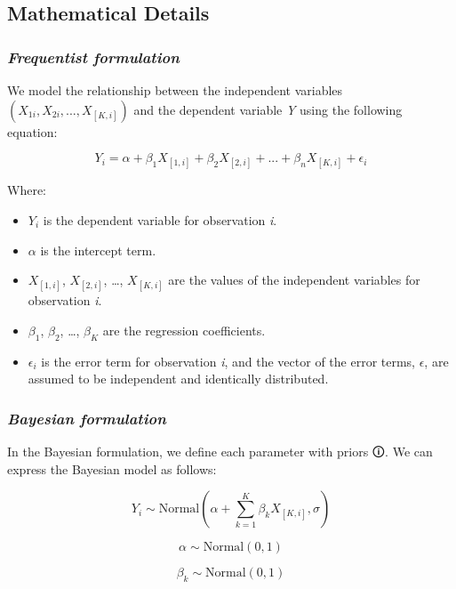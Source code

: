 \documentclass[
  letterpaper,
  DIV=11,
  numbers=noendperiod]{scrartcl}
\begin{document}
\subsection{Mathematical Details}\label{mathematical-details}

\subsubsection{\texorpdfstring{\emph{Frequentist
formulation}}{Frequentist formulation}}\label{frequentist-formulation}

We model the relationship between the independent variables
\((X_{1i}, X_{2i}, ..., X_{[K,i]})\) and the dependent variable \emph{Y}
using the following equation:

\[
𝑌_i = \alpha +\beta_1  𝑋_{[1,i]} + \beta_2  𝑋_{[2,i]} + ... + \beta_n  𝑋_{[K,i]} + \epsilon_i
\]

Where:

\begin{itemize}
\item
  \(Y_i\) is the dependent variable for observation \emph{i}.
\item
  \(\alpha\) is the intercept term.
\item
  \(X_{[1,i]}\), \(X_{[2,i]}\), \ldots, \(X_{[K,i]}\) are the values of
  the independent variables for observation \emph{i}.
\item
  \(\beta_1\), \(\beta_2\), \ldots, \(\beta_K\) are the regression
  coefficients.
\item
  \(\epsilon_i\) is the error term for observation \emph{i}, and the
  vector of the error terms, \(\epsilon\), are assumed to be independent
  and identically distributed.
\end{itemize}

\subsubsection{\texorpdfstring{\emph{Bayesian
formulation}}{Bayesian formulation}}\label{bayesian-formulation}

In the Bayesian formulation, we define each parameter with
\label{prior}{{priors 🛈}}. We can express the Bayesian
model as follows:

\[
𝑌_i \sim \text{Normal}(\alpha + \sum_{k=1}^K  \beta_k  X_{[K,i]}, σ)
\]

\[
\alpha \sim \text{Normal}(0,1)
\]

\[
\beta_k \sim \text{Normal}(0,1)
\]
\end{document}
